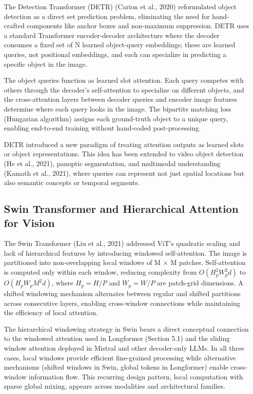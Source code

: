 \documentclass[10pt,twocolumn]{article}
\begin{document}
The Detection Transformer (DETR) (Carion et al., 2020) reformulated object detection as a direct set prediction problem, eliminating the need for hand-crafted components like anchor boxes and non-maximum suppression. DETR uses a standard Transformer encoder-decoder architecture where the decoder consumes a fixed set of N learned object-query embeddings; these are learned queries, not positional embeddings, and each can specialize in predicting a specific object in the image.

The object queries function as learned slot attention. Each query competes with others through the decoder's self-attention to specialize on different objects, and the cross-attention layers between decoder queries and encoder image features determine where each query looks in the image. The bipartite matching loss (Hungarian algorithm) assigns each ground-truth object to a unique query, enabling end-to-end training without hand-coded post-processing.

DETR introduced a new paradigm of treating attention outputs as learned slots or object representations. This idea has been extended to video object detection (He et al., 2021), panoptic segmentation, and multimodal understanding (Kamath et al., 2021), where queries can represent not just spatial locations but also semantic concepts or temporal segments.

\subsection{Swin Transformer and Hierarchical Attention for Vision}\label{swin-transformer-and-hierarchical-attention-for-vision}

The Swin Transformer (Liu et al., 2021) addressed ViT's quadratic scaling and lack of hierarchical features by introducing windowed self-attention. The image is partitioned into non-overlapping local windows of M $\times$ M patches. Self-attention is computed only within each window, reducing complexity from $O(H_p^2W_p^2d)$ to $O(H_pW_pM^2d)$, where $H_p=H/P$ and $W_p=W/P$ are patch-grid dimensions. A shifted windowing mechanism alternates between regular and shifted partitions across consecutive layers, enabling cross-window connections while maintaining the efficiency of local attention.

The hierarchical windowing strategy in Swin bears a direct conceptual connection to the windowed attention used in Longformer (Section 5.1) and the sliding window attention deployed in Mistral and other decoder-only LLMs. In all three cases, local windows provide efficient fine-grained processing while alternative mechanisms (shifted windows in Swin, global tokens in Longformer) enable cross-window information flow. This recurring design pattern, local computation with sparse global mixing, appears across modalities and architectural families.
\end{document}
